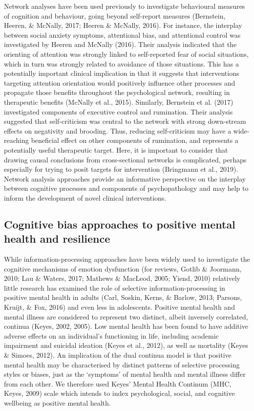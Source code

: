 \documentclass[
  english,
  man]{apa6}
\begin{document}
Network analyses have been used previously to investigate behavioural measures of cognition and behaviour, going beyond self-report measures (Bernstein, Heeren, \& McNally, 2017; Heeren \& McNally, 2016). For instance, the interplay between social anxiety symptoms, attentional bias, and attentional control was investigated by Heeren and McNally (2016). Their analysis indicated that the orienting of attention was strongly linked to self-reported fear of social situations, which in turn was strongly related to avoidance of those situations. This has a potentially important clinical implication in that it suggests that interventions targeting attention orientation would positively influence other processes and propagate those benefits throughout the psychological network, resulting in therapeutic benefits (McNally et al., 2015). Similarly, Bernstein et al. (2017) investigated components of executive control and rumination. Their analysis suggested that self-criticism was central to the network with strong down-stream effects on negativity and brooding. Thus, reducing self-criticism may have a wide-reaching beneficial effect on other components of rumination, and represents a potentially useful therapeutic target. Here, it is important to consider that drawing causal conclusions from cross-sectional networks is complicated, perhaps especially for trying to posit targets for intervention (Bringmann et al., 2019). Network analysis approaches provide an informative perspective on the interplay between cognitive processes and components of psychopathology and may help to inform the development of novel clinical interventions.

\hypertarget{cognitive-bias-approaches-to-positive-mental-health-and-resilience}{%
\subsection{Cognitive bias approaches to positive mental health and resilience}\label{cognitive-bias-approaches-to-positive-mental-health-and-resilience}}

While information-processing approaches have been widely used to investigate the cognitive mechanisms of emotion dysfunction (for reviews, Gotlib \& Joormann, 2010; Lau \& Waters, 2017; Mathews \& MacLeod, 2005; Yiend, 2010) relatively little research has examined the role of selective information-processing in positive mental health in adults (Carl, Soskin, Kerns, \& Barlow, 2013; Parsons, Kruijt, \& Fox, 2016) and even less in adolescents. Positive mental health and mental illness are considered to represent two distinct, albeit inversely correlated, continua (Keyes, 2002, 2005). Low mental health has been found to have additive adverse effects on an individual's functioning in life, including academic impairment and suicidal ideation (Keyes et al., 2012), as well as mortality (Keyes \& Simoes, 2012). An implication of the dual continua model is that positive mental health may be characterised by distinct patterns of selective processing styles or biases, just as the `symptoms' of mental health and mental illness differ from each other. We therefore used Keyes' Mental Health Continum (MHC, Keyes, 2009) scale which intends to index psychological, social, and cognitive wellbeing as positive mental health.
\end{document}
